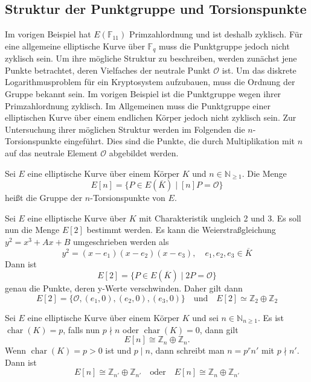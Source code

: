 \subsection{Struktur der Punktgruppe und Torsionspunkte}
Im vorigen Beispiel hat $E(\mathbb F_{11})$ Primzahlordnung und ist deshalb zyklisch. Für eine allgemeine elliptische Kurve über $\mathbb F_q$ muss die Punktgruppe jedoch nicht zyklisch sein. Um ihre mögliche Struktur zu beschreiben, werden zunächst jene Punkte betrachtet, deren Vielfaches der neutrale Punkt $\mathcal O$ ist. Um das diskrete Logarithmusproblem für ein Kryptosystem aufzubauen, muss die Ordnung der Gruppe bekannt sein. Im vorigen Beispiel ist die Punktgruppe wegen ihrer Primzahlordnung zyklisch. Im Allgemeinen muss die Punktgruppe einer elliptischen Kurve über einem
endlichen Körper jedoch nicht zyklisch sein. Zur Untersuchung ihrer möglichen Struktur werden
im Folgenden die $n$-Torsionspunkte eingeführt.
Dies sind die Punkte, die durch Multiplikation
mit $n$ auf das neutrale Element $\mathcal O$
abgebildet werden.
\begin{definition}[$n$-Torsionspunkte]\label{def:n-torsionspunkte}
    Sei $E$ eine elliptische Kurve über einem Körper $K$ und
    $n\in\mathbb N_{\geq 1}$. Die Menge
    \[
        E[n]
        =
        \{P\in E(\overline K)\mid [n]P=\mathcal O\}
    \]
    heißt die Gruppe der $n$-Torsionspunkte von $E$.
\end{definition}
\begin{beispiel}
    Sei $E$ eine elliptische Kurve über $K$ mit Charakteristik ungleich 2 und 3. Es soll nun die Menge $E[2]$ bestimmt werden. Es kann die Weierstraßgleichung $y^2=x^3+Ax+B$ umgeschrieben werden als
    \[
        y^2=(x-e_1)(x-e_2)(x-e_3), \quad e_1,e_2,e_3\in\overline{K}
    \]
    Dann ist
    \[
        E[2]=\{P\in E(\overline{K})\mid2P=\mathcal{O}\}
    \]
    genau die Punkte, deren y-Werte verschwinden. Daher gilt dann
    \[
        E[2]=\{\mathcal{O},(e_1,0),(e_2,0),(e_3,0)\} \quad \text{und} \quad E[2]\simeq \mathbb{Z}_2\oplus \mathbb{Z}_2
    \]
\end{beispiel}

\begin{theorem}\label{theo:torsionsstruktur}
    Sei $E$ eine elliptische Kurve über einem Körper $K$ und sei $n\in\mathbb N_{n\geq1}$. Es ist  $\operatorname{char}(K)=p$, falls nun $p\nmid n$ oder $\operatorname{char}(K)=0$, dann gilt
    \[
        E[n]\cong \mathbb{Z}_n \oplus \mathbb{Z}_n.
    \]
    Wenn $\operatorname{char}(K)=p>0$ ist und $p\mid n$, dann schreibt man $n=p^r n'$ mit $p\nmid n'$. Dann ist
    \[
        E[n] \cong \mathbb Z_{n'} \oplus \mathbb Z_{n'} \quad\text{oder}\quad E[n] \cong \mathbb{Z}_n \oplus \mathbb Z_{n'}
    \]
\end{theorem}

